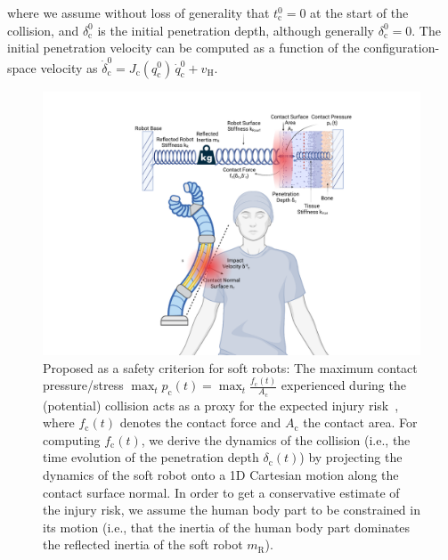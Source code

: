 where we assume without loss of generality that $t_\mathrm{c}^0=0$ at the start of the collision, and $\delta_\mathrm{c}^0$ is the initial penetration depth, although generally $\delta_\mathrm{c}^0 = 0$.
The initial penetration velocity can be computed as a function of the configuration-space velocity as $\dot{\delta}_\mathrm{c}^0 = J_\mathrm{c}(q_{\mathrm{c}}^0) \, \dot{q}_{\mathrm{c}}^0 + v_\mathrm{H}$.

\begin{figure}[h!]
    \centering
    \includegraphics[width=0.65\linewidth]{safetymetric/figures/injury_severity_criterion_illustration.pdf}
    \caption{Proposed  as a safety criterion for soft robots: The maximum contact pressure/stress $\max_t p_\mathrm{c}(t) = \max_t \frac{f_\mathrm{c}(t)}{A_\mathrm{c}}$ experienced during the (potential) collision acts as a proxy for the expected injury risk~\citep{iso2016collaborative}, where $f_\mathrm{c}(t)$ denotes the contact force and $A_\mathrm{c}$ the contact area. For computing $f_\mathrm{c}(t)$, we derive the dynamics of the collision (i.e., the time evolution of the penetration depth $\delta_\mathrm{c}(t)$) by projecting the dynamics of the soft robot onto a 1D Cartesian motion along the contact surface normal. In order to get a conservative estimate of the injury risk, we assume the human body part to be constrained in its motion (i.e., that the inertia of the human body part dominates the reflected inertia of the soft robot $m_\mathrm{R}$).}
    \label{fig:safetymetric:injury_severity_criterion_illustration}
\end{figure}

